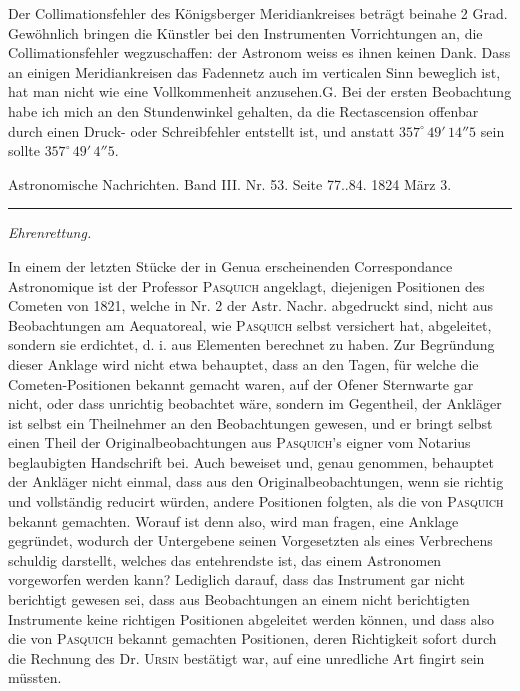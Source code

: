 \par\bigskip
\hypertarget{native-639-lower}{}
\expandafter\def\csname HistoricalNoteText35\endcsname{Der Collimationsfehler des Königsberger Meridiankreises beträgt beinahe 2 Grad. Gewöhnlich bringen die Künstler bei den Instrumenten Vorrichtungen an, die Collimationsfehler wegzuschaffen: der Astronom weiss es ihnen keinen Dank. Dass an einigen Meridiankreisen das Fadennetz auch im verticalen Sinn beweglich ist, hat man nicht wie eine Vollkommenheit anzusehen.\hfill G.}
\expandafter\def\csname HistoricalNoteText36\endcsname{Bei der ersten Beobachtung habe ich mich an den Stundenwinkel gehalten, da die Rectascension offenbar durch einen Druck- oder Schreibfehler entstellt ist, und anstatt $357^\circ\,49'\,14''5$ sein sollte $357^\circ\,49'\,4''5$.}
\begin{center}\small Astronomische Nachrichten. Band III. Nr. 53. Seite 77..84. 1824 März 3.\\[3pt]\rule{.72\linewidth}{.3pt}\end{center}
\begin{center}\emph{Ehrenrettung.}\end{center}

In einem der letzten Stücke der in Genua erscheinenden Correspondance Astronomique ist der Professor \textsc{Pasquich} angeklagt, diejenigen Positionen des Cometen von 1821, welche in Nr. 2 der Astr. Nachr. abgedruckt sind, nicht aus Beobachtungen am Aequatoreal, wie \textsc{Pasquich} selbst versichert hat, abgeleitet, sondern sie erdichtet, d. i. aus Elementen berechnet zu haben. Zur Begründung dieser Anklage wird nicht etwa behauptet, dass an den Tagen, für welche die Cometen-Positionen bekannt gemacht waren, auf der Ofener Sternwarte gar nicht, oder dass unrichtig beobachtet wäre, sondern im Gegentheil, der Ankläger ist selbst ein Theilnehmer an den Beobachtungen gewesen, und er bringt selbst einen Theil der Originalbeobachtungen aus \textsc{Pasquich}'s eigner vom Notarius beglaubigten Handschrift bei. Auch beweiset und, genau genommen, behauptet der Ankläger nicht einmal, dass aus den Originalbeobachtungen, wenn sie richtig und vollständig reducirt würden, andere Positionen folgten, als die von \textsc{Pasquich} bekannt gemachten. Worauf ist denn also, wird man fragen, eine Anklage gegründet, wodurch der Untergebene seinen Vorgesetzten als eines Verbrechens schuldig darstellt, welches das entehrendste ist, das einem Astronomen vorgeworfen werden kann? Lediglich darauf, dass das Instrument gar nicht berichtigt gewesen sei, dass aus Beobachtungen an einem nicht berichtigten Instrumente keine richtigen Positionen abgeleitet werden können, und dass also die von \textsc{Pasquich} bekannt gemachten Positionen, deren Richtigkeit sofort durch die Rechnung des Dr. \textsc{Ursin} bestätigt war, auf eine unredliche Art fingirt sein müssten.

